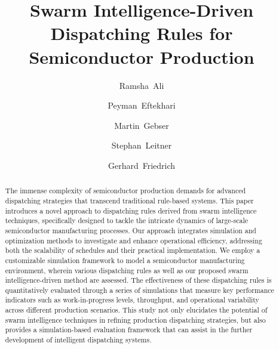 \documentclass[runningheads]{llncs}
\begin{document}
%
\title{Swarm Intelligence-Driven Dispatching Rules for Semiconductor Production
}
%
%
\author{Ramsha~Ali \and
Peyman~Eftekhari \and
Martin~Gebser \and
Stephan~Leitner \and
Gerhard~Friedrich
}
%
%

%
\maketitle              %
%
\begin{abstract}
The immense complexity of semiconductor production
demands for advanced dispatching strategies that transcend traditional rule-based systems. This paper introduces a novel approach to dispatching rules derived from swarm intelligence techniques, specifically designed to tackle the intricate dynamics of large-scale semiconductor manufacturing processes. Our approach integrates simulation and optimization methods to investigate and enhance operational efficiency, addressing both the scalability of schedules and their practical implementation. We employ a customizable simulation framework to model a semiconductor manufacturing environment, wherein various dispatching rules %
as well as our proposed swarm intelligence-driven method are assessed.
The effectiveness of these dispatching rules is quantitatively evaluated through a series of simulations that measure key performance indicators such as work-in-progress levels, throughput, and operational variability across different production scenarios.
This study not only elucidates the potential of swarm intelligence techniques in refining production dispatching strategies, but also provides a simulation-based evaluation framework that can assist in the further development of intelligent dispatching systems. 

\end{abstract}
%
%
%
\end{document}
